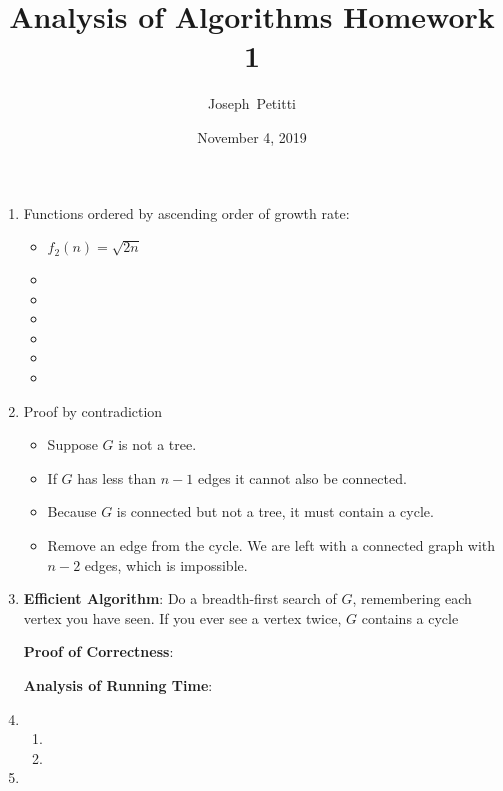 \documentclass[a4paper, 10pt, american]{article}
\title{Analysis of Algorithms Homework 1}
\author{Joseph~Petitti}
\date{November 4, 2019}
\begin{document}
\maketitle

\begin{enumerate}
	\item Functions ordered by ascending order of growth rate:
		\begin{itemize}
			\item $f_2(n) = \sqrt{2n}$
			\item
			\item
			\item
			\item
			\item
			\item
		\end{itemize}

	\item Proof by contradiction
		\begin{itemize}
			\item Suppose $G$ is not a tree.
			\item If $G$ has less than $n-1$ edges it cannot also be connected.
			\item Because $G$ is connected but not a tree, it must contain a
				cycle.
			\item Remove an edge from the cycle. We are left with a connected
				graph with $n-2$ edges, which is impossible.
		\end{itemize}

	\item \textbf{Efficient Algorithm}: Do a breadth-first search of $G$,
		remembering each vertex you have seen. If you ever see a vertex twice,
		$G$ contains a cycle

		\textbf{Proof of Correctness}: 

		\textbf{Analysis of Running Time}:

	\item \begin{enumerate}
			\item
			\item
		\end{enumerate}


	\item
\end{enumerate}
\end{document}
